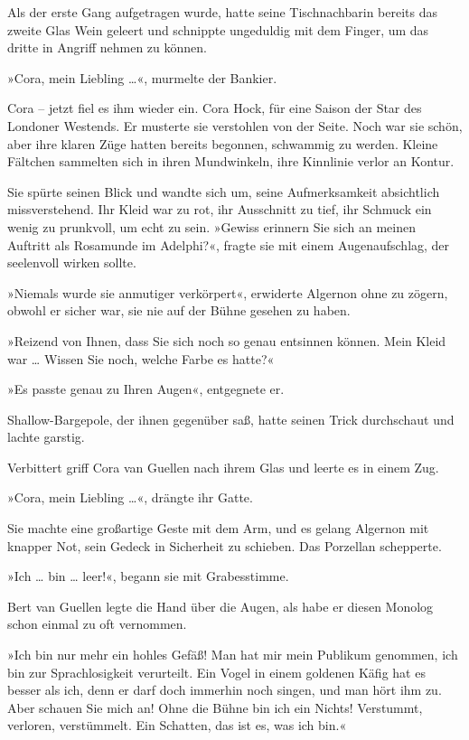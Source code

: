 Als der erste Gang aufgetragen wurde, hatte seine Tischnachbarin
bereits das zweite Glas Wein geleert und schnippte ungeduldig mit
dem Finger, um das dritte in Angriff nehmen zu können.

\bigpar

»Cora, mein Liebling \ldots{}«, murmelte der Bankier.

Cora – jetzt fiel es ihm wieder ein. Cora Hock, für eine Saison der
Star des Londoner Westends. Er musterte sie verstohlen von der
Seite. Noch war sie schön, aber ihre klaren Züge hatten bereits
begonnen, schwammig zu werden. Kleine Fältchen sammelten sich in
ihren Mundwinkeln, ihre Kinnlinie verlor an Kontur.

Sie spürte seinen Blick und wandte sich um, seine Aufmerksamkeit
absichtlich missverstehend. Ihr Kleid war zu rot, ihr Ausschnitt zu
tief, ihr Schmuck ein wenig zu prunkvoll, um echt zu sein. »Gewiss
erinnern Sie sich an meinen Auftritt als Rosamunde im Adelphi?«,
fragte sie mit einem Augenaufschlag, der seelenvoll wirken sollte.

»Niemals wurde sie anmutiger verkörpert«, erwiderte Algernon ohne
zu zögern, obwohl er sicher war, sie nie auf der Bühne gesehen zu
haben.

»Reizend von Ihnen, dass Sie sich noch so genau entsinnen können.
Mein Kleid war \ldots{} Wissen Sie noch, welche Farbe es hatte?«

»Es passte genau zu Ihren Augen«, entgegnete er.

Shallow-Bargepole, der ihnen gegenüber saß, hatte seinen Trick
durchschaut und lachte garstig.

Verbittert griff Cora van Guellen nach ihrem Glas und leerte es in
einem Zug.

»Cora, mein Liebling \ldots{}«, drängte ihr Gatte.

Sie machte eine großartige Geste mit dem Arm, und es gelang
Algernon mit knapper Not, sein Gedeck in Sicherheit zu schieben.
Das Porzellan schepperte.

»Ich \ldots{} bin \ldots{} leer!«, begann sie mit Grabesstimme.

Bert van Guellen legte die Hand über die Augen, als habe er diesen
Monolog schon einmal zu oft vernommen.

»Ich bin nur mehr ein hohles Gefäß! Man hat mir mein Publikum
genommen, ich bin zur Sprachlosigkeit verurteilt. Ein Vogel in
einem goldenen Käfig hat es besser als ich, denn er darf doch
immerhin noch singen, und man hört ihm zu. Aber schauen Sie mich
an! Ohne die Bühne bin ich ein Nichts! Verstummt, verloren,
verstümmelt. Ein Schatten, das ist es, was ich bin.«

